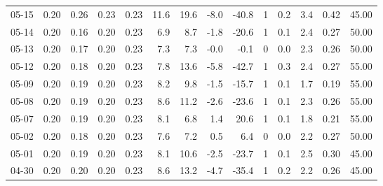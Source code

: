 \begin{threeparttable}
{\begin{tabular}{lrrrrrrrrrrrrr}
  05-15 &          0.20 &          0.26 &          0.23 &        0.23 &                11.6 &                19.6 &       -8.0 &        -40.8 &              1 &                 0.2 &              3.4 &            0.42 &                  45.00 \\
  05-14 &          0.20 &          0.16 &          0.20 &        0.23 &                 6.9 &                 8.7 &       -1.8 &        -20.6 &              1 &                 0.1 &              2.4 &            0.27 &                  50.00 \\
  05-13 &          0.20 &          0.17 &          0.20 &        0.23 &                 7.3 &                 7.3 &       -0.0 &         -0.1 &              0 &                 0.0 &              2.3 &            0.26 &                  50.00 \\
  05-12 &          0.20 &          0.18 &          0.20 &        0.23 &                 7.8 &                13.6 &       -5.8 &        -42.7 &              1 &                 0.3 &              2.4 &            0.27 &                  55.00 \\
  05-09 &          0.20 &          0.19 &          0.20 &        0.23 &                 8.2 &                 9.8 &       -1.5 &        -15.7 &              1 &                 0.1 &              1.7 &            0.19 &                  55.00 \\
  05-08 &          0.20 &          0.19 &          0.20 &        0.23 &                 8.6 &                11.2 &       -2.6 &        -23.6 &              1 &                 0.1 &              2.3 &            0.26 &                  55.00 \\
  05-07 &          0.20 &          0.19 &          0.20 &        0.23 &                 8.1 &                 6.8 &        1.4 &         20.6 &              1 &                 0.1 &              1.8 &            0.21 &                  55.00 \\
  05-02 &          0.20 &          0.18 &          0.20 &        0.23 &                 7.6 &                 7.2 &        0.5 &          6.4 &              0 &                 0.0 &              2.2 &            0.27 &                  50.00 \\
  05-01 &          0.20 &          0.19 &          0.20 &        0.23 &                 8.1 &                10.6 &       -2.5 &        -23.7 &              1 &                 0.1 &              2.5 &            0.30 &                  45.00 \\
  04-30 &          0.20 &          0.20 &          0.20 &        0.23 &                 8.6 &                13.2 &       -4.7 &        -35.4 &              1 &                 0.2 &              2.2 &            0.26 &                  45.00 \\

\end{tabular}}
\end{threeparttable}
